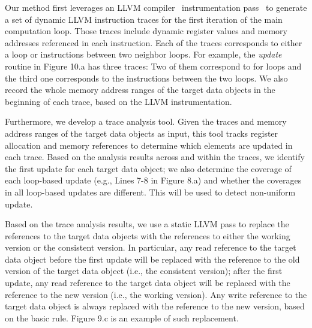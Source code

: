 Our method first leverages an LLVM compiler~\cite{Lattner:Mthesis} instrumentation pass~\cite{ispass13:shao} to generate a set of dynamic LLVM instruction traces for the first iteration of the main computation loop. 
Those traces include dynamic register values and memory addresses referenced in each instruction. 
Each of the traces corresponds to either a loop or instructions
between two neighbor loops.
For example, the \textit{update} routine in Figure 10.a has three traces:
Two of them correspond to {\selectfont for} loops and the third one corresponds to the instructions between the two loops.
We also record the whole memory address ranges of the target data objects in the beginning of each trace, based on the LLVM instrumentation.

Furthermore, we develop a trace analysis tool. Given the traces and memory address ranges of the target data objects as input, this tool tracks register allocation and memory references to determine which elements are updated in each trace.
Based on the analysis results across and within the traces, we identify the first update for each target data object; 
we also determine the coverage of each loop-based update (e.g., Lines 7-8 in Figure 8.a) and whether the coverages in all loop-based updates are different. This will be used to detect non-uniform update.

Based on the trace analysis results, we use a static LLVM pass to 
replace the references to the target data objects with 
the references to either the working version or the consistent version.
In particular, any read reference to the target data object before the first update will be replaced with the reference to the old version of the target data object (i.e., the consistent version); after the first update,
any read reference to the target data object will be replaced with
the reference to the new version (i.e., the working version). Any write reference to the target data object is always replaced with the reference to the new version, based on the basic rule.
Figure 9.c is an example of such replacement. 

